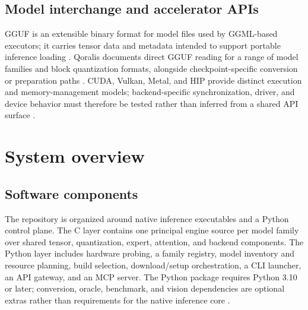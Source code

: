 \documentclass[10pt,twocolumn]{article}
\begin{document}
\subsection{Model interchange and accelerator APIs}
GGUF is an extensible binary format for model files used by GGML-based executors; it carries tensor data and metadata intended to support portable inference loading \cite{ggufspec}. Qoralis documents direct GGUF reading for a range of model families and block quantization formats, alongside checkpoint-specific conversion or preparation paths \cite{qoralisgguf}. CUDA, Vulkan, Metal, and HIP provide distinct execution and memory-management models; backend-specific synchronization, driver, and device behavior must therefore be tested rather than inferred from a shared API surface \cite{cudaguide,vulkanspec}.

\section{System overview}
\subsection{Software components}
The repository is organized around native inference executables and a Python control plane. The C layer contains one principal engine source per model family over shared tensor, quantization, expert, attention, and backend components. The Python layer includes hardware probing, a family registry, model inventory and resource planning, build selection, download/setup orchestration, a CLI launcher, an API gateway, and an MCP server. The Python package requires Python 3.10 or later; conversion, oracle, benchmark, and vision dependencies are optional extras rather than requirements for the native inference core \cite{qoralispyproject,qoralisrepo}.
\end{document}
